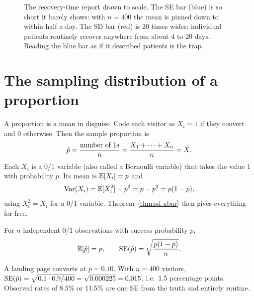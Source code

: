 \begin{figure}[H]
\centering
{}
\caption{The recovery-time report drawn to scale. The SE bar (blue) is so short
it barely shows: with $n=400$ the mean is pinned down to within half a day. The
SD bar (red) is 20 times wider: individual patients routinely recover anywhere
from about 4 to 20 days. Reading the blue bar as if it described patients is the
trap.}
\label{fig:sd-errbars}
\end{figure}

\section{The sampling distribution of a proportion}
\label{sec:sd-prop}

A proportion is a mean in disguise. Code each visitor as $X_i=1$ if they convert
and $0$ otherwise. Then the sample proportion is
\[
\hat p=\frac{\text{number of 1s}}{n}=\frac{X_1+\dots+X_n}{n}=\bar{X} .
\]
Each $X_i$ is a 0/1 variable (also called a Bernoulli variable) that takes the value 1 with probability $p$. Its mean is $\operatorname{\mathbb{E}}[X_i]=p$ and
\[
\operatorname{Var}(X_i)=\operatorname{\mathbb{E}}[X_i^2]-p^2=p-p^2=p(1-p),
\]
using $X_i^2=X_i$ for a 0/1 variable. Theorem~\ref{thm:sd-xbar} then gives
everything for free.

\begin{theorem}
For $n$ independent 0/1 observations with success probability $p$,
\[
\operatorname{\mathbb{E}}[\hat p]=p,\qquad \operatorname{SE}(\hat p)=\sqrt{\frac{p(1-p)}{n}}.
\]
\end{theorem}

\begin{example}
A landing page converts at $p=0.10$. With $n=400$ visitors,
$\operatorname{SE}(\hat p)=\sqrt{0.1\cdot 0.9/400}=\sqrt{0.000225}=0.015$, i.e.\ 1.5 percentage
points. Observed rates of 8.5\% or 11.5\% are one SE from the truth and entirely
routine.
\end{example}

